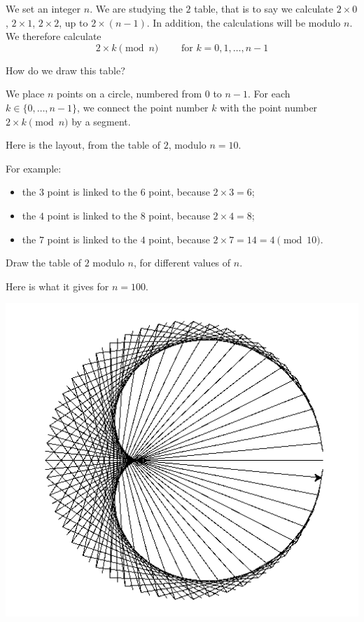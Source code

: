 \documentclass[11pt,class=report,crop=false]{standalone}
\begin{document}
\begin{activite}



We set an integer $n$. We are studying the $2$ table, that is to say 
we calculate $2 \times 0$, $2\times 1$, $2 \times 2$, up to $2 \times (n-1)$. In addition, the calculations will be modulo $n$. We therefore calculate  
$$2 \times k \pmod{n} \qquad \text{ for } k=0,1,\ldots,n-1$$

How do we draw this table?

We place $n$ points on a circle, numbered from $0$ to $n-1$.
For each $k\in \{0,\ldots,n-1\}$, we connect the point number $k$
with the point number $2\times k \pmod{n}$ by a segment. 

Here is the layout, from the table of $2$, modulo $n=10$.



For example:
\begin{itemize}
  \item the $3$ point is linked to the $6$ point, because $2 \times 3 = 6$;
  \item the $4$ point is linked to the $8$ point, because $2 \times 4 = 8$;
  \item the $7$ point is linked to the $4$ point, because $2 \times 7 = 14 = 4 \pmod{10}$.
\end{itemize}

\bigskip

Draw the table of $2$ modulo $n$, for different values of $n$.

Here is what it gives for $n=100$.

\begin{center}
\includegraphics[scale=\myscale,scale=0.5]{screen-turtle-5b}
\end{center}


\end{activite}
\end{document}
